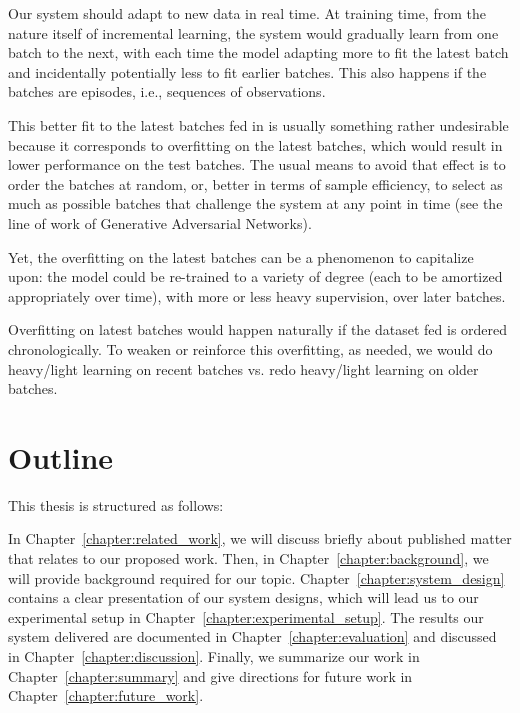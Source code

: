 Our system should adapt to new data in real time. At training time, from the nature itself of incremental learning, the system would gradually learn from one batch to the next, with each time the model adapting more to fit the latest batch and incidentally potentially less to fit earlier batches. This also happens if the batches are episodes, i.e., sequences of observations.

This better fit to the latest batches fed in is usually something rather undesirable because it corresponds to overfitting on the latest batches, which would result in lower performance on the test batches. The usual means to avoid that effect is to order the batches at random, or, better in terms of sample efficiency, to select as much as possible batches that challenge the system at any point in time (see the line of work of Generative Adversarial Networks).

Yet, the overfitting on the latest batches can be a phenomenon to capitalize upon: the model could be re-trained to a variety of degree (each to be amortized appropriately over time), with more or less heavy supervision, over later batches.

Overfitting on latest batches would happen naturally if the dataset fed is ordered chronologically. To weaken or reinforce this overfitting, as needed, we would do heavy/light learning on recent batches vs. redo heavy/light learning on older batches.

\section{Outline}

This thesis is structured as follows:

In Chapter~\ref{chapter:related_work}, we will discuss briefly about published matter that relates to our proposed work.
Then, in Chapter~\ref{chapter:background}, we will provide background required for our topic.
Chapter~\ref{chapter:system_design} contains a clear presentation of our system designs,
which will lead us to our experimental setup in Chapter~\ref{chapter:experimental_setup}.
The results our system delivered are documented in Chapter~\ref{chapter:evaluation} and discussed in Chapter~\ref{chapter:discussion}.
Finally, we summarize our work in Chapter~\ref{chapter:summary} and give directions for future work in Chapter~\ref{chapter:future_work}.